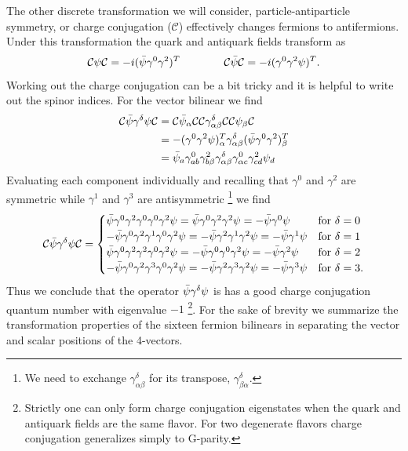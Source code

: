 The other discrete transformation we will consider, particle-antiparticle symmetry, or charge conjugation ($\mathcal{C}$) effectively changes fermions to antifermions. Under this transformation the quark and antiquark fields transform as 
\begin{equation*}
\mathcal{C} \psi \mathcal{C} = -i (\bar{\psi} \gamma^0 \gamma^2)^T \qquad \qquad \mathcal{C}\bar{\psi}\mathcal{C} = -i (\gamma^0\gamma^2\psi)^T.
\end{equation*}
Working out the charge conjugation can be a bit tricky and it is helpful to write out the spinor indices. For the vector bilinear we find 
\begin{align*}
\mathcal{C} \bar{\psi} \gamma^\delta \psi \mathcal{C} &= \mathcal{C} \bar{\psi}_\alpha \mathcal{C}\mathcal{C}\gamma^\delta_{\alpha\beta}\mathcal{C}\mathcal{C} \psi_\beta \mathcal{C} \\
& = -(\gamma^0\gamma^2\psi)^T_{\alpha} \gamma^\delta_{\alpha\beta} (\bar{\psi} \gamma^0 \gamma^2)^T_\beta \\
&= \bar{\psi}_a \gamma^0_{ab} \gamma^2_{b\beta} \gamma^\delta_{\alpha\beta}\gamma^0_{\alpha c}\gamma^2_{cd}\psi_d 
\end{align*}
Evaluating each component individually and recalling that $\gamma^0$ and $\gamma^2$ are symmetric while $\gamma^1$ and $\gamma^3$ are antisymmetric \footnote{We need to exchange $\gamma^\delta_{\alpha\beta}
$ for its transpose, $\gamma^\delta_{\beta\alpha}$.}  we find 
\begin{equation*}
\mathcal{C} \bar{\psi} \gamma^\delta \psi \mathcal{C} = \begin{cases}
\bar{\psi} \gamma^0 \gamma^2\gamma^0\gamma^0\gamma^2\psi = \bar{\psi} \gamma^0 \gamma^2\gamma^2\psi = - \bar{\psi} \gamma^0 \psi & \mbox{for } \delta = 0 \\
-\bar{\psi} \gamma^0 \gamma^2\gamma^1\gamma^0\gamma^2\psi = -\bar{\psi} \gamma^2\gamma^1\gamma^2\psi = - \bar{\psi} \gamma^1 \psi & \mbox{for } \delta = 1 \\
\bar{\psi} \gamma^0 \gamma^2\gamma^2\gamma^0\gamma^2\psi = -\bar{\psi} \gamma^0 \gamma^0\gamma^2\psi = - \bar{\psi} \gamma^2 \psi & \mbox{for } \delta = 2\\
-\bar{\psi} \gamma^0 \gamma^2\gamma^3\gamma^0\gamma^2\psi = -\bar{\psi} \gamma^2\gamma^3\gamma^2\psi = - \bar{\psi} \gamma^3 \psi & \mbox{for } \delta = 3. \\
\end{cases} 
\end{equation*}
Thus we conclude that the operator $\bar{\psi} \gamma^\delta \psi$ is has a good charge conjugation quantum number with eigenvalue $-1$ \footnote{Strictly one can only form charge conjugation eigenstates when the quark and antiquark fields are the same flavor. For two degenerate flavors charge conjugation generalizes simply to G-parity.}. For the sake of brevity we summarize the transformation properties of the sixteen fermion bilinears in   separating the vector and scalar positions of the 4-vectors. 

